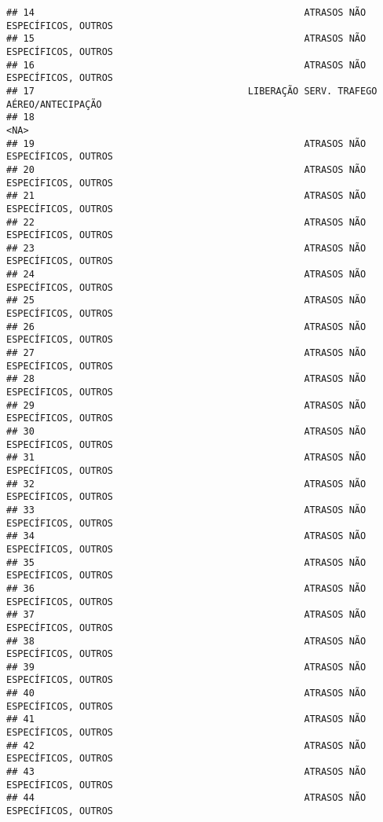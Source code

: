 \documentclass[
]{article}
\begin{document}
\begin{verbatim}
## 14                                                ATRASOS NÃO ESPECÍFICOS, OUTROS
## 15                                                ATRASOS NÃO ESPECÍFICOS, OUTROS
## 16                                                ATRASOS NÃO ESPECÍFICOS, OUTROS
## 17                                      LIBERAÇÃO SERV. TRAFEGO AÉREO/ANTECIPAÇÃO
## 18                                                                           <NA>
## 19                                                ATRASOS NÃO ESPECÍFICOS, OUTROS
## 20                                                ATRASOS NÃO ESPECÍFICOS, OUTROS
## 21                                                ATRASOS NÃO ESPECÍFICOS, OUTROS
## 22                                                ATRASOS NÃO ESPECÍFICOS, OUTROS
## 23                                                ATRASOS NÃO ESPECÍFICOS, OUTROS
## 24                                                ATRASOS NÃO ESPECÍFICOS, OUTROS
## 25                                                ATRASOS NÃO ESPECÍFICOS, OUTROS
## 26                                                ATRASOS NÃO ESPECÍFICOS, OUTROS
## 27                                                ATRASOS NÃO ESPECÍFICOS, OUTROS
## 28                                                ATRASOS NÃO ESPECÍFICOS, OUTROS
## 29                                                ATRASOS NÃO ESPECÍFICOS, OUTROS
## 30                                                ATRASOS NÃO ESPECÍFICOS, OUTROS
## 31                                                ATRASOS NÃO ESPECÍFICOS, OUTROS
## 32                                                ATRASOS NÃO ESPECÍFICOS, OUTROS
## 33                                                ATRASOS NÃO ESPECÍFICOS, OUTROS
## 34                                                ATRASOS NÃO ESPECÍFICOS, OUTROS
## 35                                                ATRASOS NÃO ESPECÍFICOS, OUTROS
## 36                                                ATRASOS NÃO ESPECÍFICOS, OUTROS
## 37                                                ATRASOS NÃO ESPECÍFICOS, OUTROS
## 38                                                ATRASOS NÃO ESPECÍFICOS, OUTROS
## 39                                                ATRASOS NÃO ESPECÍFICOS, OUTROS
## 40                                                ATRASOS NÃO ESPECÍFICOS, OUTROS
## 41                                                ATRASOS NÃO ESPECÍFICOS, OUTROS
## 42                                                ATRASOS NÃO ESPECÍFICOS, OUTROS
## 43                                                ATRASOS NÃO ESPECÍFICOS, OUTROS
## 44                                                ATRASOS NÃO ESPECÍFICOS, OUTROS

\end{verbatim}
\end{document}
